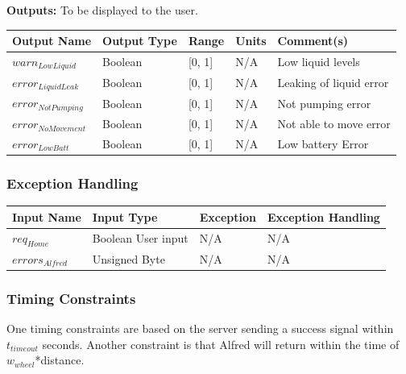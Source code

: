 \documentclass [10pt]{article}
\begin{document}
\textbf{Outputs: } To be displayed to the user.\\
\begin{longtable}{|l|l|l|l|l|}\hline 
	\rowcolor{tableCell}\textbf{Output Name} & \textbf{Output Type} & \textbf{Range} & \textbf{Units} & \textbf{Comment(s)} \\ \hline
	$  warn_{LowLiquid} $ & Boolean & [0, 1]& N/A & Low liquid levels \\ \hline
	\rowcolor{tableCell}$  error_{LiquidLeak} $ & Boolean & [0, 1]& N/A & Leaking of liquid error \\ \hline
	$  error_{NotPumping} $ & Boolean & [0, 1]& N/A & Not pumping error \\ \hline
	\rowcolor{tableCell}$  error_{NoMovement} $ & Boolean & [0, 1]& N/A & Not able to move error \\ \hline
	$  error_{LowBatt} $ & Boolean & [0, 1]& N/A & Low battery Error \\ \hline
\end{longtable}


\pagebreak

\subsubsection{Exception Handling}

\begin{longtable}{|l|l|l|l|}\hline 
	\rowcolor{tableCell}\textbf{Input Name} & \textbf{Input Type} & \textbf{Exception} & \textbf{Exception Handling} \\ \hline
	$ req_{Home} $ & Boolean User input & N/A & N/A \\ \hline
	\rowcolor{tableCell}$  errors_{Alfred} $ & Unsigned Byte & N/A & N/A \\ \hline
\end{longtable}


\subsubsection{Timing Constraints}
One timing constraints are based on the server sending a success signal within  $ t_{timeout} $ seconds. Another constraint is that Alfred will return within the time of $ w_{wheel} $*distance.
\end{document}
